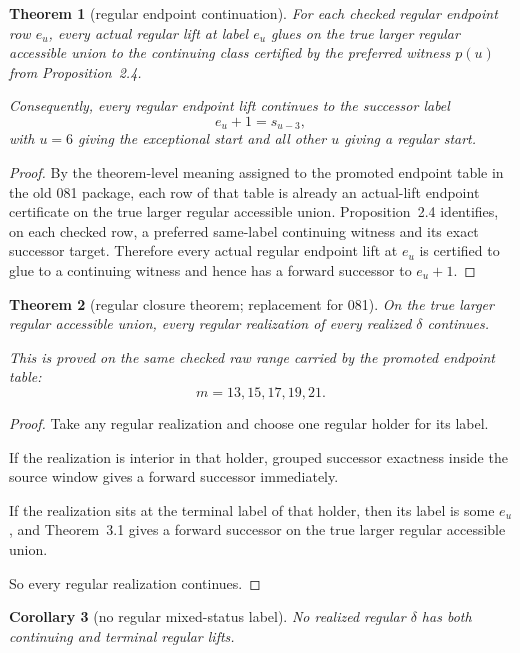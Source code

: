 \documentclass[11pt]{article}
\newtheorem{theorem}{Theorem}[section]
\newtheorem{corollary}[theorem]{Corollary}
\begin{document}
\begin{theorem}[regular endpoint continuation]
For each checked regular endpoint row $e_u$, every actual regular lift at label
$e_u$ glues on the true larger regular accessible union to the continuing class
certified by the preferred witness $p(u)$ from Proposition~2.4.

Consequently, every regular endpoint lift continues to the successor label
\[
e_u + 1 = s_{u-3},
\]
with $u=6$ giving the exceptional start and all other $u$ giving a regular
start.
\end{theorem}

\begin{proof}
By the theorem-level meaning assigned to the promoted endpoint table in the old
081 package, each row of that table is already an actual-lift endpoint
certificate on the true larger regular accessible union. Proposition~2.4
identifies, on each checked row, a preferred same-label continuing witness and
its exact successor target. Therefore every actual regular endpoint lift at
$e_u$ is certified to glue to a continuing witness and hence has a forward
successor to $e_u+1$.
\end{proof}

\begin{theorem}[regular closure theorem; replacement for 081]
On the true larger regular accessible union, every regular realization of every
realized $\delta$ continues.

This is proved on the same checked raw range carried by the promoted endpoint
table:
\[
m = 13,15,17,19,21.
\]
\end{theorem}

\begin{proof}
Take any regular realization and choose one regular holder for its label.

If the realization is interior in that holder, grouped successor exactness
inside the source window gives a forward successor immediately.

If the realization sits at the terminal label of that holder, then its label is
some $e_u$, and Theorem~3.1 gives a forward successor on the true larger
regular accessible union.

So every regular realization continues.
\end{proof}

\begin{corollary}[no regular mixed-status label]
No realized regular $\delta$ has both continuing and terminal regular lifts.
\end{corollary}
\end{document}
